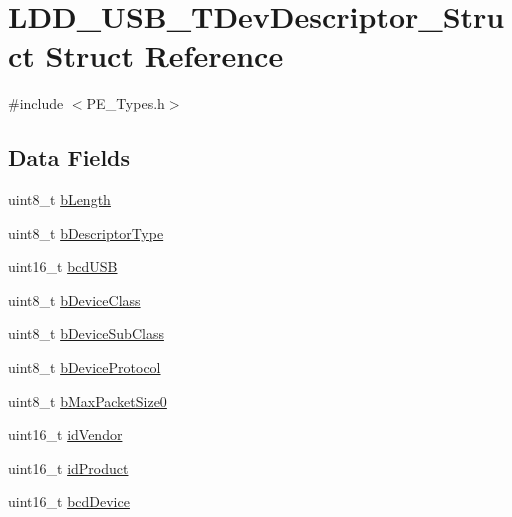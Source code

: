 \hypertarget{struct_l_d_d___u_s_b___t_dev_descriptor___struct}{}\section{L\+D\+D\+\_\+\+U\+S\+B\+\_\+\+T\+Dev\+Descriptor\+\_\+\+Struct Struct Reference}
\label{struct_l_d_d___u_s_b___t_dev_descriptor___struct}


{\ttfamily \#include $<$P\+E\+\_\+\+Types.\+h$>$}

\subsection*{Data Fields}
\begin{DoxyCompactItemize}
\item 
uint8\+\_\+t \hyperlink{struct_l_d_d___u_s_b___t_dev_descriptor___struct_a786fc767e0651f6b7146fc691f66747d}{b\+Length}
\item 
uint8\+\_\+t \hyperlink{struct_l_d_d___u_s_b___t_dev_descriptor___struct_ad5ce775d75a2e1f139b1cd74f89854cf}{b\+Descriptor\+Type}
\item 
uint16\+\_\+t \hyperlink{struct_l_d_d___u_s_b___t_dev_descriptor___struct_af78882a5888196664c86e334f2be35c2}{bcd\+U\+SB}
\item 
uint8\+\_\+t \hyperlink{struct_l_d_d___u_s_b___t_dev_descriptor___struct_af0bf5f3b57b927cb04613bb888fd1e90}{b\+Device\+Class}
\item 
uint8\+\_\+t \hyperlink{struct_l_d_d___u_s_b___t_dev_descriptor___struct_aaaa3f52ada623e59338fbba8670bb3bd}{b\+Device\+Sub\+Class}
\item 
uint8\+\_\+t \hyperlink{struct_l_d_d___u_s_b___t_dev_descriptor___struct_a9a49b20d1bd0c7f39345e3963645636d}{b\+Device\+Protocol}
\item 
uint8\+\_\+t \hyperlink{struct_l_d_d___u_s_b___t_dev_descriptor___struct_a4f0c4e61ccb6ed2bdccdb6b6fbd8c95c}{b\+Max\+Packet\+Size0}
\item 
uint16\+\_\+t \hyperlink{struct_l_d_d___u_s_b___t_dev_descriptor___struct_a3ca2eabe9034c627759b9c3435f4ac62}{id\+Vendor}
\item 
uint16\+\_\+t \hyperlink{struct_l_d_d___u_s_b___t_dev_descriptor___struct_a70f350fe88205de699efe58fdb60e3d4}{id\+Product}
\item 
uint16\+\_\+t \hyperlink{struct_l_d_d___u_s_b___t_dev_descriptor___struct_ab5ed57c271bb34676c0074942f40fd24}{bcd\+Device}

\end{DoxyCompactItemize}
